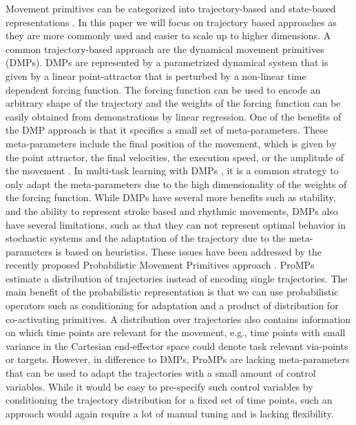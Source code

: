 Movement primitives can be categorized into trajectory-based
\cite{Ijspeert2003,Rozo2013,Paraschos2013} and state-based representations
\cite{Khansari-Zadeh2011}. In this paper
we will focus on trajectory based approaches as they are more commonly used and easier to scale up to higher dimensions. A common trajectory-based
approach are the dynamical movement primitives (DMPs). DMPs \cite{Ijspeert2003} are represented by a parametrized dynamical system that is given
by a linear point-attractor that is perturbed by a non-linear time dependent forcing function. The forcing function can be used to encode an arbitrary 
shape of the trajectory and the weights of the forcing function can be easily obtained from demonstrations by linear regression. One of the benefits
of the DMP approach is that it specifies a small set of meta-parameters. These meta-parameters include the final position of 
the movement, which is given by the point attractor, the final velocities, the execution speed, or the amplitude of the movement \cite{Kober2010a,Pastor2009,Ijspeert2003}. 
In multi-task learning with DMPs \cite{Kober2010,forte2012line,Kupcsik2013}, it is a common strategy to only adapt the meta-parameters 
due to the high dimensionality of the  weights of the forcing function. While DMPs have several more benefits such as stability, 
and the ability to represent stroke based and rhythmic movements, DMPs also have several limitations, such as that they can not represent optimal behavior in stochastic systems and the adaptation of the trajectory due to the meta-parameters is based on heuristics.
These issues have been addressed by the recently proposed Probabilistic Movement Primitives approach \cite{Paraschos2013,Paraschos2013a}. 
ProMPs estimate a distribution of trajectories instead of encoding 
single trajectories. The main benefit of the probabilistic representation is that we can use probabilistic operators such 
as conditioning for adaptation and a product of distribution for co-activating primitives. 
A distribution over trajectories also contains information on which time points are relevant for the movement, 
e.g., time points with small variance in the Cartesian end-effector space could denote task relevant via-points or targets.  
However, in difference to DMPs, ProMPs are lacking meta-parameters 
that can be used to adapt the trajectories with a small amount of control variables. While it would be easy to pre-specify such control variables by 
conditioning the trajectory distribution for a fixed set of time points, such an approach would again require a lot of manual tuning and is lacking flexibility. 

